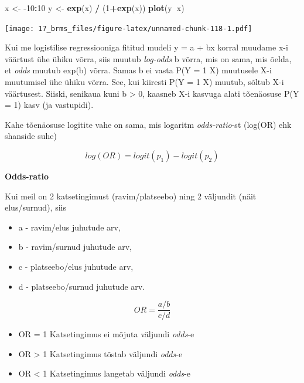 \documentclass[]{book}
\newenvironment{Shaded}{\begin{snugshade}}{\end{snugshade}}
\newcommand{\DecValTok}[1]{\textcolor[rgb]{0.00,0.00,0.81}{#1}}
\newcommand{\KeywordTok}[1]{\textcolor[rgb]{0.13,0.29,0.53}{\textbf{#1}}}
\newcommand{\NormalTok}[1]{#1}
\newcommand{\OperatorTok}[1]{\textcolor[rgb]{0.81,0.36,0.00}{\textbf{#1}}}
\newcommand{\StringTok}[1]{\textcolor[rgb]{0.31,0.60,0.02}{#1}}
\begin{document}
\begin{Shaded}
\begin{Highlighting}[]
\NormalTok{x <-}\StringTok{ }\DecValTok{-10}\OperatorTok{:}\DecValTok{10}
\NormalTok{y <-}\StringTok{ }\KeywordTok{exp}\NormalTok{(x) }\OperatorTok{/}\StringTok{ }\NormalTok{(}\DecValTok{1}\OperatorTok{+}\KeywordTok{exp}\NormalTok{(x))}
\KeywordTok{plot}\NormalTok{(y}\OperatorTok{~}\NormalTok{x)}
\end{Highlighting}
\end{Shaded}

\texttt{[image: 17\_brms\_files/figure-latex/unnamed-chunk-118-1.pdf]}

Kui me logistilise regressiooniga fititud mudeli y = a + bx korral muudame x-i väärtust ühe ühiku võrra, siis muutub \emph{log-odds} b võrra, mis on sama, mis õelda, et \emph{odds} muutub exp(b) võrra. Samas b ei vasta P(Y = 1 \textbar{} X) muutusele X-i muutumisel ühe ühiku võrra. See, kui kiiresti P(Y = 1 \textbar{} X) muutub, sõltub X-i väärtusest. Siiski, senikaua kuni b \textgreater{} 0, kaasneb X-i kasvuga alati tõenäosuse P(Y = 1) kasv (ja vastupidi).

Kahe tõenäosuse logitite vahe on sama, mis logaritm \emph{odds-ratio}-st (log(OR) ehk shanside suhe)

\[{log} (OR)= {logit} (p_{1})- {logit} (p_{2})\]

\textbf{Odds-ratio}

Kui meil on 2 katsetingimust (ravim/platseebo) ning 2 väljundit (näit elus/surnud), siis

\begin{itemize}
\item
  a - ravim/elus juhutude arv,
\item
  b - ravim/surnud juhutude arv,
\item
  c - platseebo/elus juhutude arv,
\item
  d - platseebo/surnud juhutude arv.
\end{itemize}

\[OR = \frac {a/b}{c/d}\]

\begin{itemize}
\item
  OR = 1 Katsetingimus ei mõjuta väljundi \emph{odds}-e
\item
  OR \textgreater{} 1 Katsetingimus tõstab väljundi \emph{odds}-e
\item
  OR \textless{} 1 Katsetingimus langetab väljundi \emph{odds}-e
\end{itemize}
\end{document}
